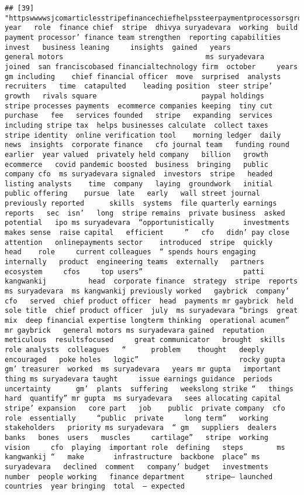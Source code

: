 \documentclass[
]{article}
\begin{document}
\begin{verbatim}
## [39] "httpswwwwsjcomarticlesstripefinancechiefhelpssteerpaymentprocessorsgrowth  year   role  finance chief  stripe  dhivya suryadevara  working  build   payment processor’ finance team strengthen  reporting capabilities  invest   business leaning     insights  gained   years                        general motors                                  ms suryadevara          joined  san franciscobased financialtechnology firm  october     years  gm including    chief financial officer  move  surprised  analysts  recruiters   time  catapulted    leading position  steer stripe’ growth   rivals square                         paypal holdings          stripe processes payments  ecommerce companies keeping  tiny cut   purchase   fee   services founded   stripe   expanding  services including stripe tax  helps businesses calculate  collect taxes  stripe identity  online verification tool    morning ledger  daily news  insights  corporate finance   cfo journal team   funding round earlier  year valued  privately held company   billion   growth  ecommerce   covid pandemic boosted  business  bringing   public company cfo  ms suryadevara signaled  investors  stripe   headed   listing analysts    time  company   laying  groundwork   initial public offering    pursue  late   early   wall street journal previously reported      skills  systems  file quarterly earnings reports   sec  isn’   long  stripe remains  private business  asked   potential   ipo ms suryadevara  “opportunistically       investments   makes sense  raise capital   efficient     ”   cfo   didn’ pay close attention   onlinepayments sector    introduced  stripe  quickly   head    role     current colleagues  “ spends hours engaging internally   product  engineering teams  externally   partners   ecosystem     cfos     top users”                        patti kangwankij          head  corporate finance  strategy  stripe  reports  ms suryadevara  ms kangwankij previously worked   gaybrick  company’  cfo   served  chief product officer  head  payments mr gaybrick  held  sole title  chief product officer  july  ms suryadevara “brings  great mix  deep financial expertise longterm thinking  operational acumen” mr gaybrick   general motors ms suryadevara gained  reputation   meticulous  resultsfocused     great communicator   brought  skills    role analysts  colleagues   “      problem    thought   deeply  encouraged   poke holes   logic”                        rocky gupta          gm’ treasurer  worked  ms suryadevara   years mr gupta   important thing ms suryadevara taught     issue earnings guidance  periods  uncertainty      gm’  plants  suffering   weekslong strike “   things   hard  quantify” mr gupta  ms suryadevara   sees allocating capital  stripe’ expansion   core part   job    public  private company  cfo role  essentially     “public  private     long term”   working  stakeholders   priority ms suryadevara  “ gm   suppliers  dealers  banks   bones  users   muscles     cartilage”   stripe  working   vision     cfo  playing  important role  defining   steps        ms kangwankij “   make       infrastructure  backbone  place” ms suryadevara   declined  comment   company’ budget   investments   number  people working   finance department     stripe— launched   countries  year bringing  total  — expected  
\end{verbatim}
\end{document}
